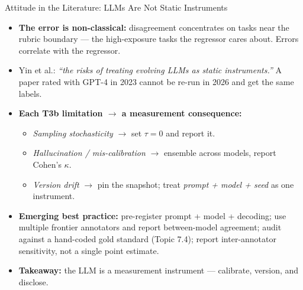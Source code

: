 \begin{frame}{Attitude in the Literature: LLMs Are Not Static Instruments}
\begin{itemize}
\item \textbf{The error is non-classical:} disagreement concentrates on tasks near the rubric boundary --- the high-exposure tasks the regressor cares about. Errors correlate with the regressor.

\medskip
\item Yin et al.: \emph{``the risks of treating evolving LLMs as static instruments.''} A paper rated with GPT-4 in 2023 cannot be re-run in 2026 and get the same labels.

\medskip
\item \textbf{Each T3b limitation $\to$ a measurement consequence:}
\begin{itemize}
\item \emph{Sampling stochasticity} $\to$ set $\tau = 0$ and report it.
\item \emph{Hallucination / mis-calibration} $\to$ ensemble across models, report Cohen's $\kappa$.
\item \emph{Version drift} $\to$ pin the snapshot; treat \emph{prompt + model + seed} as one instrument.
\end{itemize}

\medskip
\item \textbf{Emerging best practice:} pre-register prompt + model + decoding; use multiple frontier annotators and report between-model agreement; audit against a hand-coded gold standard (Topic 7.4); report inter-annotator sensitivity, not a single point estimate.

\medskip
\item \textbf{Takeaway:} the LLM is a measurement instrument --- calibrate, version, and disclose.
\end{itemize}
\end{frame}

